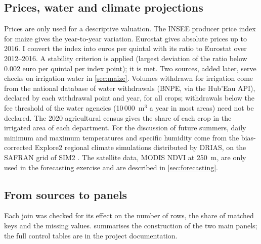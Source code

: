 \subsection{Prices, water and climate projections}

Prices are only used for a descriptive valuation. The INSEE producer price index for maize gives the year-to-year variation. Eurostat gives absolute prices up to 2016. I convert the index into euros per quintal with its ratio to Eurostat over 2012--2016. A stability criterion is applied (largest deviation of the ratio below 0.002 euro per quintal per index point); it is met. Two sources, added later, serve checks on irrigation water in \cref{sec:maize}. Volumes withdrawn for irrigation come from the national database of water withdrawals (BNPE, via the Hub'Eau API), declared by each withdrawal point and year, for all crops; withdrawals below the fee threshold of the water agencies (10\,000~m$^3$ a year in most areas) need not be declared. The 2020 agricultural census gives the share of each crop in the irrigated area of each department. For the discussion of future summers, daily minimum and maximum temperatures and specific humidity come from the bias-corrected Explore2 regional climate simulations distributed by DRIAS, on the SAFRAN grid of SIM2 \parencite{drias2022}. The satellite data, MODIS NDVI at 250~m, are only used in the forecasting exercise and are described in \cref{sec:forecasting}.

\subsection{From sources to panels}

Each join was checked for its effect on the number of rows, the share of matched keys and the missing values.  summarises the construction of the two main panels; the full control tables are in the project documentation.

